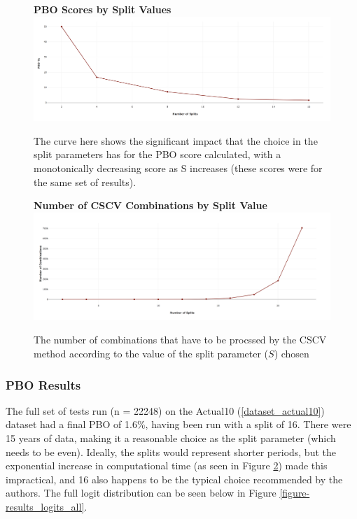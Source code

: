 \documentclass[a4paper,11pt,oneside]{article}
\theoremstyle{plain}
\theoremstyle{definition}
\begin{document}
\begin{figure}[H]
	\centering 
	\textbf{PBO Scores by Split Values}
	\includegraphics[scale=0.25]{images/results/pbo/PBO_by_Split.png} 
	\caption[PBO Scores by Split Values]{
		\newline The curve here shows the significant impact that the choice in the split parameters has for the PBO score calculated, with a monotonically decreasing score as S increases (these scores were for the same set of results). }
	\label{figure-PBO_by_Split}
\end{figure}

\begin{figure}[H]
	\centering 
	\textbf{Number of CSCV Combinations by Split Value}
	\includegraphics[scale=0.25]{images/results/pbo/combination_sizes.png} 
	\caption[Number of CSCV Combinations by Split Value]{
		\newline The number of combinations that have to be procssed by the CSCV method according to the value of the split parameter ($S$) chosen}
	\label{figure-s_combinations}
\end{figure}


\subsubsection{PBO Results}


The full set of tests run (n = 22248) on the Actual10 (\ref{dataset_actual10}) dataset had a final PBO of 1.6\%, having been run with a split of 16. There were 15 years of data, making it a reasonable choice as the split parameter (which needs to be even). Ideally, the splits would represent shorter periods, but the exponential increase in computational time (as seen in Figure \ref{figure-s_combinations}) made this impractical, and 16 also happens to be the typical choice recommended by the authors. The full logit distribution can be seen below in Figure \ref{figure-results_logits_all}.
\end{document}
